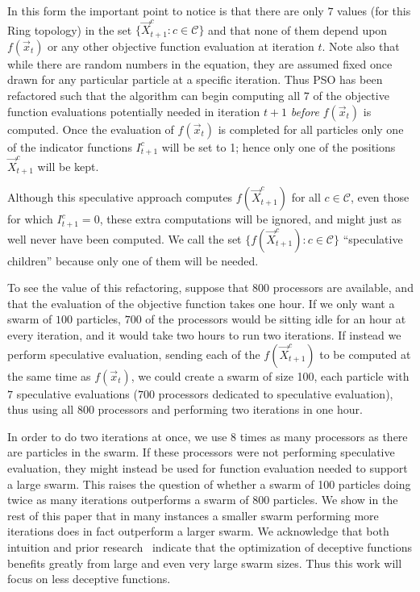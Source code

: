 \documentclass{llncs}
\providecommand{\ppos}{\ensuremath{\Vec{x}}}
\providecommand{\ofunc}{\ensuremath{f}}
\providecommand{\indic}{\ensuremath{I}}
\providecommand{\specpos}{\ensuremath{\vec{X}}}
\providecommand{\caseset}{\ensuremath{\mathcal{C}}}
\providecommand{\casegen}{\ensuremath{c}}
\begin{document}
In this form the important point to notice is that there are only $7$ values
(for this Ring topology) in the set $\{\specpos_{t+1}^{\casegen}: \casegen \in
\caseset\}$ and that none of them depend upon $f(\ppos_t)$ or any other
objective function evaluation at iteration $t$.  Note also that while there are
random numbers in the equation, they are assumed fixed once drawn for any
particular particle at a specific iteration.  Thus PSO has been refactored such
that the algorithm can begin computing all $7$ of the objective function
evaluations potentially needed in iteration $t+1$ \emph{before} $f(\ppos_t)$ is
computed.  Once the evaluation of $f(\ppos_{t})$ is completed for all particles
only one of the indicator functions $\indic_{t+1}^{\casegen}$ will be set to 1;
hence only one of the positions $\specpos_{t+1}^\casegen$ will be kept.

Although this speculative approach computes $\ofunc(\specpos_{t+1}^{\casegen})$
for all $\casegen \in \caseset$, even those for which $\indic_{t+1}^{\casegen}
= 0$, these extra computations will be ignored, and might just as well never
have been computed.  We call the set $\{\ofunc(\specpos_{t+1}^{c}) : \casegen
\in \caseset\}$ ``speculative children'' because only one of them will be
needed.

To see the value of this refactoring, suppose that $800$ processors are
available, and that the evaluation of the objective function takes one hour.
If we only want a swarm of $100$ particles, $700$ of the processors would be
sitting idle for an hour at every iteration, and it would take two hours to run
two iterations.  If instead we perform speculative evaluation, sending each of
the $\ofunc(\specpos_{t+1}^{c})$ to be computed at the same time as
$\ofunc(\ppos_{t})$, we could create a swarm of size 100, each particle with
$7$ speculative evaluations ($700$ processors dedicated to speculative
evaluation), thus using all $800$ processors and performing two iterations in
one hour.

In order to do two iterations at once, we use 8 times as many processors as
there are particles in the swarm.  If these processors were not performing
speculative evaluation, they might instead be used for function evaluation
needed to support a large swarm.  This raises the question of whether a swarm
of 100 particles doing twice as many iterations outperforms a swarm of 800
particles.  We show in the rest of this paper that in many instances a smaller
swarm performing more iterations does in fact outperform a larger swarm.  We
acknowledge that both intuition and prior
research~\cite{mcnabb-2009-large-particle-swarms} indicate that the
optimization of deceptive functions benefits greatly from large and even very
large swarm sizes. Thus this work will focus on less deceptive functions.
\end{document}
